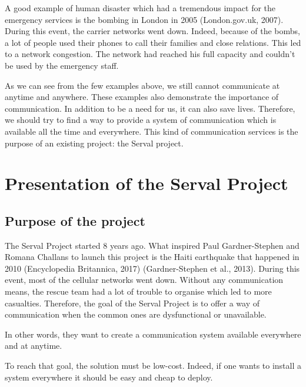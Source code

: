 A good example of human disaster which had a tremendous impact for the emergency services is the bombing in London in 2005 (London.gov.uk, 2007). During this event, the carrier networks went down. Indeed, because of the bombs, a lot of people used their phones to call their families and close relations. This led to a network congestion. The network had reached his full capacity and couldn’t be used by the emergency staff. 

As we can see from the few examples above, we still cannot communicate at anytime and anywhere. These examples also demonstrate the importance of communication. In addition to be a need for us, it can also save lives. Therefore, we should try to find a way to provide a system of communication which is available all the time and everywhere.
This kind of communication services is the purpose of an existing project: the Serval project. 






\section{Presentation of the Serval Project}
\subsection{Purpose of the project}

The Serval Project started 8 years ago. What inspired Paul Gardner-Stephen and Romana Challans to launch this project is the Haiti earthquake that happened in 2010 (Encyclopedia Britannica, 2017) (Gardner-Stephen et al., 2013). During this event, most of the cellular networks went down. Without any communication means, the rescue team had a lot of trouble to organise which led to more casualties. Therefore, the goal of the Serval Project is to offer a way of communication when the common ones are dysfunctional or unavailable.

In other words, they want to create a communication system available everywhere and at anytime.

To reach that goal, the solution must be low-cost. Indeed, if one wants to install a system everywhere it should be easy and cheap to deploy.




